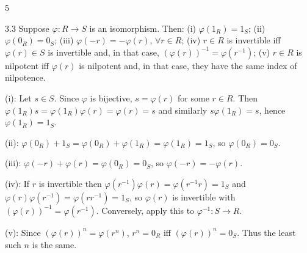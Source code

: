\documentclass[8pt]{extarticle}
\makeatletter
\renewenvironment{proof}[1][\proofname]{%
  \par%
  \pushQED{\qed}%
  \normalfont
  \topsep=2pt\partopsep=0pt\parsep=0pt\itemsep=0pt%
  \trivlist
  \item[\hskip\labelsep\itshape #1\@addpunct{.}]\ignorespaces
}{%
  \popQED\endtrivlist\@endpefalse
  \vspace{-1pt}%
}
\makeatother
\begin{document}
\begin{multicols}{5}
{{
            }
        }
        \vspace{-1pt}

        \begin{lemma}{3.3}
            Suppose \(\varphi:R\to S\) is an isomorphism. Then: (i) \(\varphi(1_R)=1_S\); (ii) \(\varphi(0_R)=0_S\); (iii) \(\varphi(-r)=-\varphi(r)\), \(\forall r\in R\); (iv) \(r\in R\) is invertible iff \(\varphi(r)\in S\) is invertible and, in that case, \((\varphi(r))^{-1}=\varphi(r^{-1})\); (v) \(r\in R\) is nilpotent iff \(\varphi(r)\) is nilpotent and, in that case, they have the same index of nilpotence.
        \end{lemma}

        \begin{proof}
            (i): Let \(s\in S\). Since \(\varphi\) is bijective, \(s=\varphi(r)\) for some \(r\in R\). Then \(\varphi(1_R)s=\varphi(1_R)\varphi(r)=\varphi(r)=s\) and similarly \(s\varphi(1_R)=s\), hence \(\varphi(1_R)=1_S\).

            (ii): \(\varphi(0_R)+1_S=\varphi(0_R)+\varphi(1_R)=\varphi(1_R)=1_S\), so \(\varphi(0_R)=0_S\).

            (iii): \(\varphi(-r)+\varphi(r)=\varphi(0_R)=0_S\), so \(\varphi(-r)=-\varphi(r)\).

            (iv): If \(r\) is invertible then \(\varphi(r^{-1})\varphi(r)=\varphi(r^{-1}r)=1_S\) and \(\varphi(r)\varphi(r^{-1})=\varphi(rr^{-1})=1_S\), so \(\varphi(r)\) is invertible with \((\varphi(r))^{-1}=\varphi(r^{-1})\). Conversely, apply this to \(\varphi^{-1}:S\to R\).

            (v): Since \((\varphi(r))^n=\varphi(r^n)\), \(r^n=0_R\) iff \((\varphi(r))^n=0_S\). Thus the least such \(n\) is the same.
        \end{proof}


\end{multicols}
\end{document}
